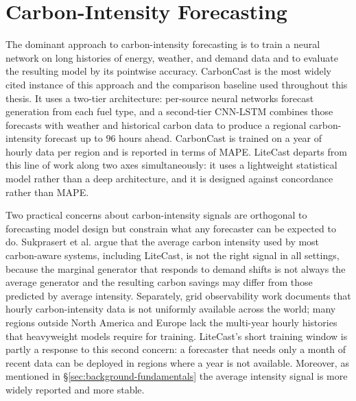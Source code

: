 

\section{Carbon-Intensity Forecasting}
\label{sec:related-forecasting}

The dominant approach to carbon-intensity forecasting is to train a neural network on long histories of energy, weather, and demand data and to evaluate the resulting model by its pointwise accuracy.
CarbonCast \cite{maji_carboncast_2022} is the most widely cited instance of this approach and the comparison baseline used throughout this thesis.
It uses a two-tier architecture: per-source neural networks forecast generation from each fuel type, and a second-tier CNN-LSTM combines those forecasts with weather and historical carbon data to produce a regional carbon-intensity forecast up to $96$ hours ahead.
CarbonCast is trained on a year of hourly data per region and is reported in terms of MAPE.
LiteCast departs from this line of work along two axes simultaneously: it uses a lightweight statistical model rather than a deep architecture, and it is designed against concordance rather than MAPE.

Two practical concerns about carbon-intensity signals are orthogonal to forecasting model design but constrain what any forecaster can be expected to do.
Sukprasert et al. \cite{sukprasert_limitations_2024} argue that the average carbon intensity used by most carbon-aware systems, including LiteCast, is not the right signal in all settings, because the marginal generator that responds to demand shifts is not always the average generator and the resulting carbon savings may differ from those predicted by average intensity. 
Separately, grid observability work \cite{grid_observability} documents that hourly carbon-intensity data is not uniformly available across the world; many regions outside North America and Europe lack the multi-year hourly histories that heavyweight models require for training.
LiteCast's short training window is partly a response to this second concern: a forecaster that needs only a month of recent data can be deployed in regions where a year is not available.
Moreover, as mentioned in \S\ref{sec:background-fundamentals} the average intensity signal is more widely reported and more stable. 

